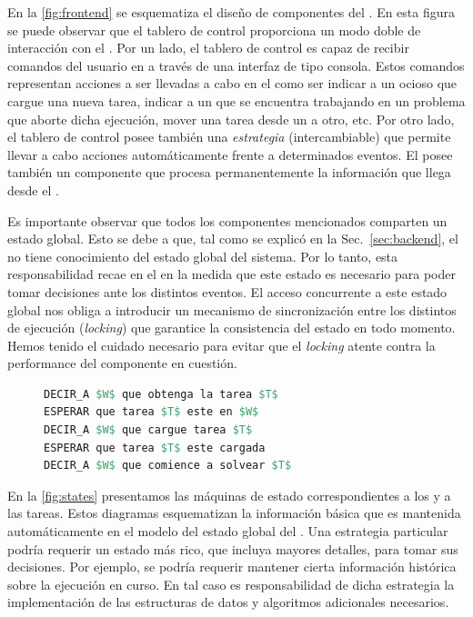 En la \fig\ref{fig:frontend} se esquematiza el diseño de componentes del
\fend. En esta figura se puede observar que el tablero de control proporciona
un modo doble de interacción con el \bend. Por un lado, el tablero de control
es capaz de recibir comandos del usuario en \rt a través de una interfaz de
tipo consola. Estos comandos representan acciones a ser llevadas a cabo en el
\bend como ser indicar a un \w ocioso que cargue una nueva tarea, indicar a un
\w que se encuentra trabajando en un problema que aborte dicha ejecución,
mover una tarea desde un \w a otro, etc. Por otro lado, el tablero de control
posee también una \emph{estrategia} (intercambiable) que permite llevar a cabo
acciones automáticamente frente a determinados eventos. El \fend posee también
un componente que procesa permanentemente la información que llega desde el
\bend. 

Es importante observar que todos los componentes mencionados comparten un
estado global. Esto se debe a que, tal como se explicó en la Sec.~\ref{sec:backend},
el \bend no tiene conocimiento del estado global del sistema. Por lo tanto, esta responsabilidad
recae en el \fend en la medida que este estado es necesario para poder tomar
decisiones ante los distintos eventos. El acceso concurrente a este estado
global nos obliga a introducir un mecanismo de sincronización entre los
distintos \threads de ejecución (\emph{locking}) que garantice la consistencia
del estado en todo momento. Hemos tenido el cuidado necesario para evitar que
el \emph{locking} atente contra la performance del componente en cuestión.

\begin{figure}
\vspace{-2em}
\begin{footnotesize}
\begin{lstlisting}[mathescape,language=Pascal,frame=single,label=lst:synchronouscmd,caption=Esquema de comando sincrónico]
DECIR_A $W$ que obtenga la tarea $T$
ESPERAR que tarea $T$ este en $W$
DECIR_A $W$ que cargue tarea $T$
ESPERAR que tarea $T$ este cargada
DECIR_A $W$ que comience a solvear $T$
\end{lstlisting}
\end{footnotesize}
\vspace{-1.5em}
\end{figure}

En la \fig\ref{fig:states} presentamos las máquinas de estado correspondientes
a los \ws y a las tareas. Estos diagramas esquematizan la información básica que
es mantenida automáticamente en el modelo del estado global del \fend. Una estrategia
particular podría requerir un estado más rico, que incluya mayores detalles, para
tomar sus decisiones. Por ejemplo, se podría requerir mantener cierta información
histórica sobre la ejecución en curso. En tal caso es responsabilidad de dicha
estrategia la implementación de las estructuras de datos y algoritmos adicionales
necesarios.


